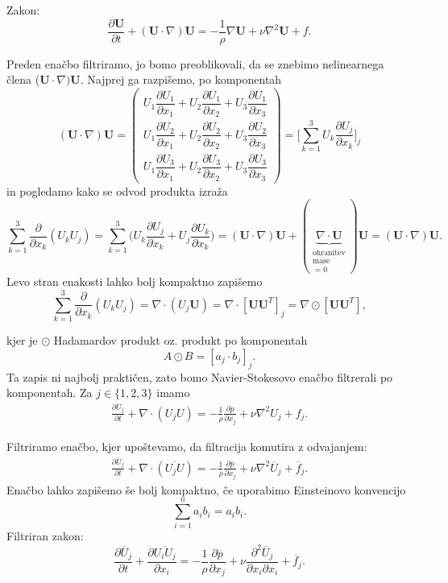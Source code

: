 \documentclass[mat2, tisk]{fmfdelo}
\newcommand{\bd}{\textbf}
\begin{document}
Zakon: 
$$
\frac{\partial \bd{U}}{\partial t} + (\bd{U}\cdot \nabla)\bd{U} = -\frac{1}{\rho} \nabla \bd{U} + \nu\nabla^2 \bd{U} + f.
$$

\noindent
Preden enačbo filtriramo, jo bomo preoblikovali, da se znebimo nelinearnega člena ($\bd{U}\cdot \nabla)\bd{U}$.
Najprej ga razpišemo, po komponentah 
\renewcommand{\arraystretch}{2.5} %
\[
(\bd{U} \cdot \nabla) \bd{U} =
\begin{pmatrix}
U_1 \dfrac{\partial U_1}{\partial x_1} + U_2 \dfrac{\partial U_1}{\partial x_2} + U_3 \dfrac{\partial U_1}{\partial x_3} \\
U_1 \dfrac{\partial U_2}{\partial x_1} + U_2 \dfrac{\partial U_2}{\partial x_2} + U_3 \dfrac{\partial U_2}{\partial x_3} \\
U_1 \dfrac{\partial U_3}{\partial x_1} + U_2 \dfrac{\partial U_3}{\partial x_2} + U_3 \dfrac{\partial U_3}{\partial x_3}
\end{pmatrix} = \Big[\sum_{k=1}^3 U_k \frac{\partial U_j}{\partial x_k}\Big]_j
\]
in pogledamo kako se odvod produkta izraža 
$$
\sum_{k=1}^3 \frac{\partial}{\partial x_k} (U_k U_j) = \sum_{k=1}^3 \Big(U_k\frac{\partial U_j}{\partial x_k}
+ U_j\frac{\partial U_k}{\partial x_k}\Big) = (\bd{U}\cdot \nabla)\bd{U} + (\underbrace{\nabla\cdot \bd{U}}_{\substack{\text{ohranitev}\\{\text{mase}}\\=0}}) \bd{U}
= (\bd{U}\cdot \nabla)\bd{U}.
$$
Levo stran enakosti lahko bolj kompaktno zapišemo
$$
\sum_{k=1}^3 \frac{\partial}{\partial x_k} (U_k U_j) = \nabla \cdot (U_j \bd{U}) = 
\nabla \cdot [\bd{U} \bd{U}^T]_{j} = \nabla \odot [\bd{U} \bd{U}^T],
$$

kjer je $\odot$ Hadamardov produkt oz. produkt po komponentah 
\[
A \odot B = \left[ a_j \cdot b_j \right]_j.
\]
Ta zapis ni najbolj praktičen, zato bomo Navier-Stokesovo enačbo filtrerali po komponentah.
Za $j\in \{1, 2, 3\}$ imamo 
\begin{align*}
\frac{\partial U_j}{\partial t} + \nabla\cdot(U_j U) = -\frac{1}{\rho} \frac{\partial p}{\partial x_j} + \nu\nabla^2 U_j + f_j.
\end{align*}

Filtriramo enačbo, kjer upoštevamo, da filtracija komutira z odvajanjem:
\begin{align*}
  \frac{\partial \overline{U}_j}{\partial t} + \nabla\cdot(\overline{U_j U}) = -\frac{1}{\rho} \frac{\partial \overline{p}}{\partial x_j} + \nu\nabla^2 \overline{U}_j + \overline{f}_j.
\end{align*}
Enačbo lahko zapišemo še bolj kompaktno, če uporabimo Einsteinovo konvencijo 
$$
\sum_{i=1}^n a_i b_i = a_i b_i.
$$
Filtriran zakon:
\begin{equation}
\frac{\partial \overline{U}_j}{\partial t} + \frac{\partial \overline{U_i U_j}}{\partial x_i} = -\frac{1}{\rho} \frac{\partial \overline{p}}{\partial x_j} + \nu \frac{\partial^2 \overline{U}_j}{\partial x_i \partial x_i} + \overline{f}_j.
\end{equation}
\end{document}
